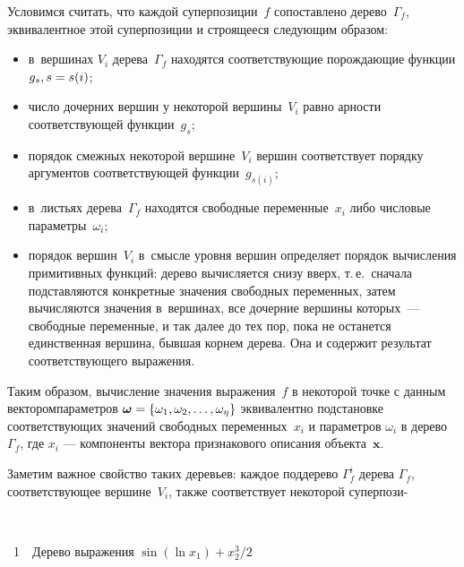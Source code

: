 \begin{multicols}{2}
Условимся считать, что каждой суперпозиции~$f$ сопоставлено дерево~$\Gamma_f$,
эквивалентное этой суперпозиции и строящееся следующим образом:
\begin{itemize}
  \item в~вершинах $V_i$ дерева~$\Gamma_f$ находятся соответствующие
    порождающие функции $g_s, s \hm= s(i)$;
  \item число дочерних вершин у некоторой вершины~$V_i$ равно арности
    соответствующей функции~$g_s$;
  \item порядок смежных некоторой вершине~$V_i$ вершин соответствует порядку
    аргументов соответствующей функции~$g_{s(i)}$;
  \item в~листьях дерева~$\Gamma_f$ находятся свободные переменные~$x_i$
    либо числовые па\-ра\-мет\-ры~$\omega_i$;
  \item порядок вершин~$V_i$ в~смысле уровня вершин определяет порядок
    вычисления примитивных функций: дерево вычисляется снизу вверх,
    т.\,е.\ сначала подставляются конкретные значения свободных переменных,
    затем вычисляются значения в~вершинах, все дочерние вершины которых~---
    свободные переменные, и так далее до тех пор, пока не останется
    единственная вершина, бывшая корнем дерева. Она и содержит результат
    соответствующего выражения.
\end{itemize}

Таким образом, вычисление значения вы\-ра\-жения~$f$ в некоторой точке с данным
вектором\linebreak параметров $\boldsymbol{\omega} \hm= \{ \omega_1, \omega_2, \dots, \omega_\eta\}$
эквивалентно подстановке соответствующих значений свободных перемен\-ных~$x_i$
и параметров $\omega_i$ в дерево~$\Gamma_f$, где $x_i$ --- компоненты
вектора признакового описания объекта~$\mathbf{x}$.

Заметим важное свойство таких деревьев: каж\-дое поддерево $\Gamma_f^i$
дерева $\Gamma_f$, соответствующее вершине~$V_i$, также соответствует
некоторой суперпози-\linebreak\vspace*{-12pt}
\begin{center}  %
\vspace*{1pt}
\mbox{%
 \epsfxsize=48.539mm
 }

 \vspace*{6pt}
{{\figurename~1}\ \ \small{Дерево выражения $\sin (\ln x_1) + {x_2^3}/{2}$}}
\end{center}



\end{multicols}
